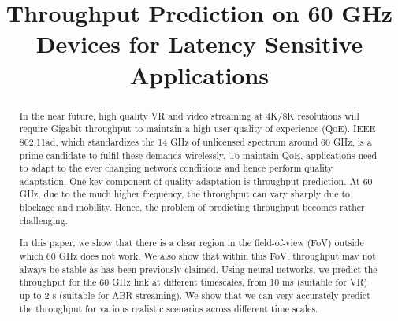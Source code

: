\documentclass[sigconf,anonymous]{acmart}
\begin{document}
\sloppy
\title{Throughput Prediction on 60 GHz Devices for Latency Sensitive Applications}


\fancyhead{}
\renewcommand\footnotetextcopyrightpermission[1]{}
\begin{abstract}

In the near future, high quality VR and video streaming at 4K/8K resolutions will require Gigabit throughput to maintain a high user quality of experience (QoE). IEEE 802.11ad, which standardizes the 14 GHz of unlicensed spectrum around 60 GHz, is a prime candidate to fulfil these demands wirelessly. To maintain QoE, applications need to adapt to the ever changing network conditions and hence perform quality adaptation. One key component of quality adaptation is throughput prediction. At 60 GHz, due to the much higher frequency, the throughput can vary sharply due to blockage and mobility. Hence, the problem of predicting throughput becomes rather challenging.

In this paper, we show that there is a clear region in the field-of-view (FoV) outside which 60 GHz does not work. We also show that within this FoV, throughput may not always be stable as has been previously claimed. Using neural networks, we predict the throughput for the 60 GHz link at different timescales, from 10 ms (suitable for VR) up to 2 s (suitable for ABR streaming). We show that we can very accurately predict the throughput for various realistic scenarios across different time scales.

\end{abstract}

\maketitle
\end{document}
